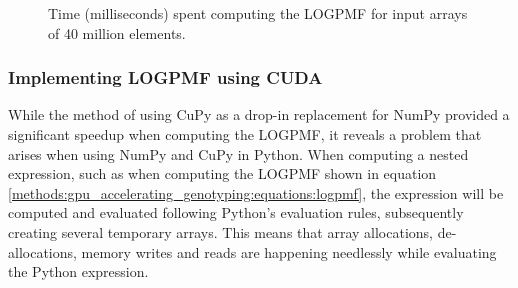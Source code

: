 \begin{figure}[H]
\hspace*{7.25em}
\caption{
  Time (milliseconds) spent computing the LOGPMF for input arrays of 40 million elements.
}
\label{methods:gpu_accelerating_genotyping:figures:logpmf_benchmark}
\end{figure}

\subsubsection{Implementing LOGPMF using CUDA}
While the method of using CuPy as a drop-in replacement for NumPy provided a significant speedup when computing the LOGPMF, it reveals a problem that arises when using NumPy and CuPy in Python.
When computing a nested expression, such as when computing the LOGPMF shown in equation \ref{methods:gpu_accelerating_genotyping:equations:logpmf}, the expression will be computed and evaluated following Python's evaluation rules, subsequently creating several temporary arrays.
This means that array allocations, de-allocations, memory writes and reads are happening needlessly while evaluating the Python expression.

